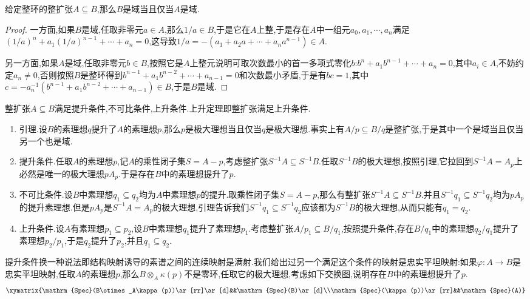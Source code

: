 给定整环的整扩张$A\subseteq B$,那么$B$是域当且仅当$A$是域.
\begin{proof}
	
	一方面,如果$B$是域,任取非零元$a\in A$,那么$1/a\in B$,于是它在$A$上整,于是存在$A$中一组元$a_0,a_1,\cdots,a_n$满足$(1/a)^n+a_1(1/a)^{n-1}+\cdots+a_n=0$,这导致$1/a=-(a_1+a_2a+\cdots+a_na^{n-1})\in A$.
	
	另一方面,如果$A$是域,任取非零元$b\in B$,按照它是$A$上整元说明可取次数最小的首一多项式零化$b$:$b^n+a_1b^{n-1}+\cdots+a_n=0$,其中$a_i\in A$,不妨约定$a_n\not=0$,否则按照$B$是整环得到$b^{n-1}+a_1b^{n-2}+\cdots+a_{n-1}=0$和次数最小矛盾,于是有$bc=1$,其中$c=-a_n^{-1}(b^{n-1}+a_1b^{n-2}+\cdots+a_{n-1})\in B$,于是$B$是域.
\end{proof}

整扩张$A\subseteq B$满足提升条件,不可比条件,上升条件.上升定理即整扩张满足上升条件.
\begin{enumerate}
	\item 引理.设$B$的素理想$q$提升了$A$的素理想$p$,那么$p$是极大理想当且仅当$q$是极大理想.事实上有$A/p\subseteq B/q$是整扩张,于是其中一个是域当且仅当另一个也是域.
	\item 提升条件.任取$A$的素理想$p$,记$A$的乘性闭子集$S=A-p$,考虑整扩张$S^{-1}A\subseteq S^{-1}B$.任取$S^{-1}B$的极大理想,按照引理,它拉回到$S^{-1}A=A_p$上必然是唯一的极大理想$pA_p$.于是存在$B$中的素理想提升了$p$.
	\item 不可比条件.设$B$中素理想$q_1\subseteq q_2$均为$A$中素理想$p$的提升.取乘性闭子集$S=A-p$,那么有整扩张$S^{-1}A\subseteq S^{-1}B$.并且$S^{-1}q_1\subseteq S^{-1}q_2$均为$pA_p$的提升素理想.但是$pA_p$是$S^{-1}A=A_p$的极大理想,引理告诉我们$S^{-1}q_1\subseteq S^{-1}q_2$应该都为$S^{-1}B$的极大理想,从而只能有$q_1=q_2$.
	\item 上升条件.设$A$有素理想$p_1\subseteq p_2$,设$B$中素理想$q_1$提升了素理想$p_1$.考虑整扩张$A/p_1\subseteq B/q_1$,按照提升条件,存在$B/q_1$中的素理想$q_2/q_1$提升了素理想$p_2/p_1$,于是$q_2$提升了$p_2$,并且$q_1\subseteq q_2$.
\end{enumerate}

提升条件换一种说法即结构映射诱导的素谱之间的连续映射是满射.我们给出过另一个满足这个条件的映射是忠实平坦映射:如果$\varphi:A\to B$是忠实平坦映射,任取$A$的素理想$p$,那么$B\otimes_A\kappa(p)$不是零环,任取它的极大理想,考虑如下交换图,说明存在$B$中的素理想提升了$p$.
$$\xymatrix{\mathrm{Spec}(B\otimes_A\kappa(p))\ar[rr]\ar[d]&&\mathrm{Spec}(B)\ar[d]\\\mathrm{Spec}(\kappa(p))\ar[rr]&&\mathrm{Spec}(A)}$$

